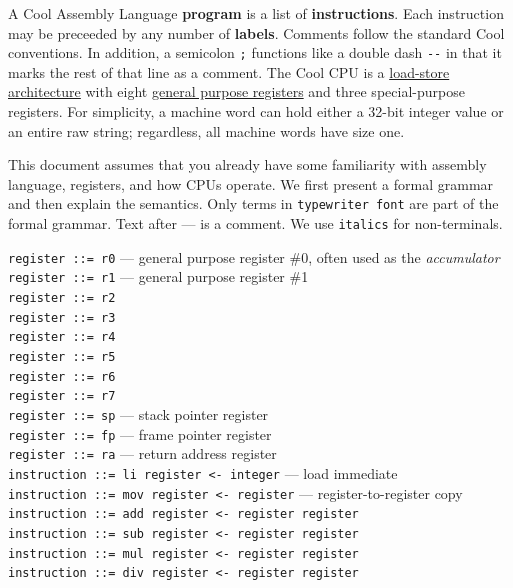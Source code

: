 \documentclass[]{article}
\begin{document}
A Cool Assembly Language \textbf{program} is a list of
\textbf{instructions}. Each instruction may be preceeded by any number
of \textbf{labels}. Comments follow the standard Cool conventions. In
addition, a semicolon \texttt{;} functions like a double dash
\texttt{-{}-} in that it marks the rest of that line as a comment. The
Cool CPU is a \href{http://en.wikipedia.org/wiki/RISC}{load-store
architecture} with eight
\href{http://en.wikipedia.org/wiki/General_purpose_register}{general
purpose registers} and three special-purpose registers. For simplicity,
a machine word can hold either a 32-bit integer value or an entire raw
string; regardless, all machine words have size one.

This document assumes that you already have some familiarity with
assembly language, registers, and how CPUs operate. We first present a
formal grammar and then explain the semantics. Only terms in
\texttt{typewriter font} are part of the formal grammar. Text after ---
is a comment. We use \texttt{italics} for non-terminals.

\texttt{register ::= r0} --- general purpose register \#0, often used as
the \emph{accumulator}\\ \texttt{register ::= r1} --- general purpose
register \#1 \\ \texttt{register ::= r2}\\ \texttt{register ::= r3}\\
\texttt{register ::= r4}\\ \texttt{register ::= r5}\\
\texttt{register ::= r6}\\ \texttt{register ::= r7}\\
\texttt{register ::= sp} --- stack pointer register\\
\texttt{register ::= fp} --- frame pointer register\\
\texttt{register ::= ra} --- return address register\\

\texttt{instruction ::= li  register \textless{}- integer} --- load
immediate \\ \texttt{instruction ::= mov register \textless{}- register}
--- register-to-register copy \\
\texttt{instruction ::= add register \textless{}- register register}\\
\texttt{instruction ::= sub register \textless{}- register register}\\
\texttt{instruction ::= mul register \textless{}- register register}\\
\texttt{instruction ::= div register \textless{}- register register}\\
\end{document}

